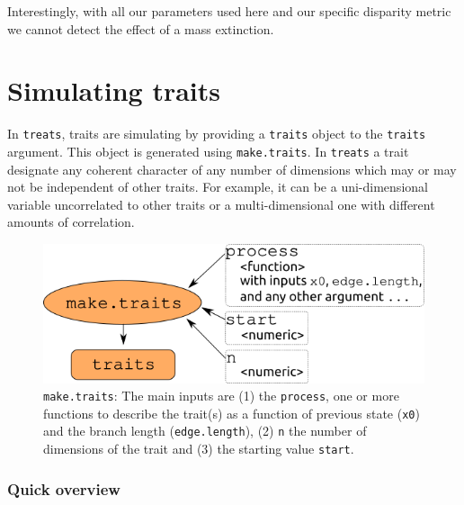 \documentclass[
]{book}
\begin{document}
Interestingly, with all our parameters used here and our specific disparity metric we cannot detect the effect of a mass extinction.

\hypertarget{maketraits}{%
\chapter{Simulating traits}\label{maketraits}}

In \texttt{treats}, traits are simulating by providing a \texttt{traits} object to the \texttt{traits} argument.
This object is generated using \texttt{make.traits}.
In \texttt{treats} a trait designate any coherent character of any number of dimensions which may or may not be independent of other traits.
For example, it can be a uni-dimensional variable uncorrelated to other traits or a multi-dimensional one with different amounts of correlation.

\begin{figure}
\centering
\includegraphics{make.traits.png}
\caption{\texttt{make.traits}: The main inputs are (1) the \texttt{process}, one or more functions to describe the trait(s) as a function of previous state (\texttt{x0}) and the branch length (\texttt{edge.length}), (2) \texttt{n} the number of dimensions of the trait and (3) the starting value \texttt{start}.}
\end{figure}

\hypertarget{quick-overview}{%
\subsection{Quick overview}\label{quick-overview}}
\end{document}
